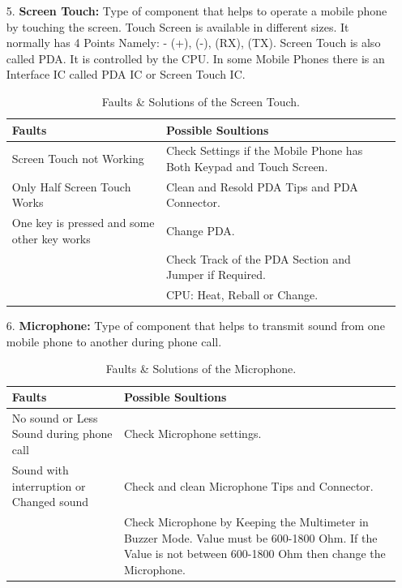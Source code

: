 \begin{itemize}
\item[5.] \textbf{Screen Touch:} Type of component that helps to operate a mobile phone by touching the screen. Touch Screen is available in different sizes. It normally has 4 Points Namely: - (+), (-), (RX), (TX). Screen Touch is also called PDA. It is controlled by the CPU. In some Mobile Phones there is an Interface IC called PDA IC or Screen Touch IC.
\begin{table}[!ht]
\centering
\begin{tabular}{|p{2.5in}|p{3.5in}|}
\hline
\textbf{Faults} & \textbf{Possible Soultions} \\ \hline
Screen Touch not Working & Check Settings if the Mobile Phone has Both Keypad and Touch Screen.\\ 
Only Half Screen Touch Works & Clean and Resold PDA Tips and PDA Connector. \\ 
One key is pressed and some other key works & Change PDA.\\ 
                & Check Track of the PDA Section and Jumper if Required.\\
                & CPU: Heat, Reball or Change.\\
\hline
\end{tabular}
\caption{Faults \& Solutions of the Screen Touch.}
\end{table}
\newpage
\item[6.] \textbf{Microphone:} Type of component that helps to transmit sound from one mobile phone
to another during phone call.
\begin{table}[!ht]
\centering
\begin{tabular}{|p{2.5in}|p{3.5in}|}
\hline
\textbf{Faults} & \textbf{Possible Soultions} \\ \hline
No sound or Less Sound during phone call & Check Microphone settings.\\ 
Sound with interruption or Changed sound & Check and clean Microphone Tips and Connector. \\ 
                & Check Microphone by Keeping the Multimeter in Buzzer Mode. Value must be 600-1800
Ohm. If the Value is not between 600-1800 Ohm then change the Microphone.\\ 
        
\hline
\end{tabular}
\caption{Faults \& Solutions of the Microphone.}
\end{table}


\end{itemize}
